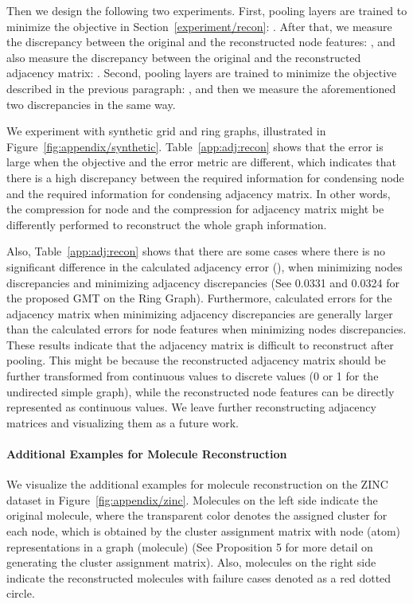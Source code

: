 \documentclass{article} \usepackage{iclr2021_conference,times}
\begin{document}
Then we design the following two experiments. First, pooling layers are trained to minimize the objective in Section~\ref{experiment/recon}: . After that, we measure the discrepancy between the original and the reconstructed node features: , and also measure the discrepancy between the original and the reconstructed adjacency matrix: . Second, pooling layers are trained to minimize the objective described in the previous paragraph: , and then we measure the aforementioned two discrepancies in the same way.

We experiment with synthetic grid and ring graphs, illustrated in Figure~\ref{fig:appendix/synthetic}. Table~\ref{app:adj:recon} shows that the error is large when the objective and the error metric are different, which indicates that there is a high discrepancy between the required information for condensing node and the required information for condensing adjacency matrix. In other words, the compression for node and the compression for adjacency matrix might be differently performed to reconstruct the whole graph information. 

Also, Table~\ref{app:adj:recon} shows that there are some cases where there is no significant difference in the calculated adjacency error (), when minimizing nodes discrepancies and minimizing adjacency discrepancies (See 0.0331 and 0.0324 for the proposed GMT on the Ring Graph). Furthermore, calculated errors for the adjacency matrix when minimizing adjacency discrepancies are generally larger than the calculated errors for node features when minimizing nodes discrepancies. These results indicate that the adjacency matrix is difficult to reconstruct after pooling. This might be because the reconstructed adjacency matrix should be further transformed from continuous values to discrete values (0 or 1 for the undirected simple graph), while the reconstructed node features can be directly represented as continuous values. We leave further reconstructing adjacency matrices and visualizing them as a future work.



\paragraph{Additional Examples for Molecule Reconstruction}
We visualize the additional examples for molecule reconstruction on the ZINC dataset in Figure~\ref{fig:appendix/zinc}. Molecules on the left side indicate the original molecule, where the transparent color denotes the assigned cluster for each node, which is obtained by the cluster assignment matrix  with node (atom) representations in a graph (molecule) (See Proposition 5 for more detail on generating the cluster assignment matrix). Also, molecules on the right side indicate the reconstructed molecules with failure cases denoted as a red dotted circle. 
\end{document}
